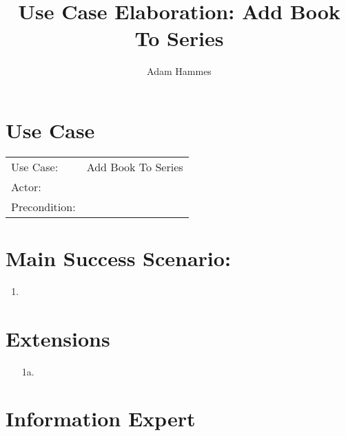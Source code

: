 \documentclass{article}
\title{Use Case Elaboration: Add Book To Series}
\author{ Adam Hammes }
\begin{document}
\maketitle


\section*{Use Case}
\begin{tabular}{l l}
Use Case:     & Add Book To Series\\
Actor:        & \\
Precondition: & \\
\end{tabular}


\section*{Main Success Scenario:}

\begin{enumerate}
    \item 

\end{enumerate}

\section*{Extensions}

\begin{itemize}
    \item [1a.]
                            
\end{itemize}


\section*{Information Expert}
\end{document}
